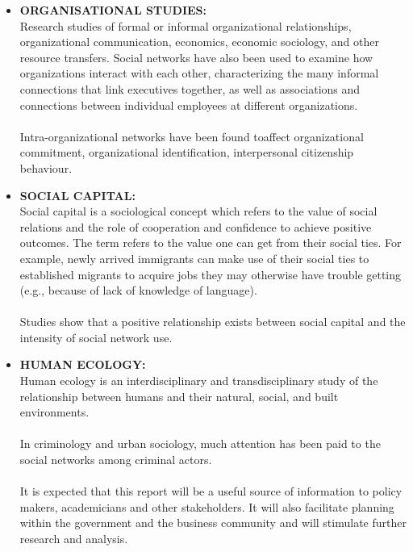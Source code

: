 \documentclass[11pt]{book}
\begin{document}
\begin{itemize}
	\item \textbf{ORGANISATIONAL STUDIES:}\\
		Research studies of  formal or informal organizational relationships, organizational communication, economics, economic sociology, and other resource transfers. Social networks have also been used to examine how organizations interact with each other, characterizing the many informal connections that link executives together, as well as associations and connections between individual employees at different organizations. \\\\Intra-organizational networks have been found toaffect organizational commitment, organizational identification, interpersonal citizenship behaviour.
	\item \textbf{SOCIAL CAPITAL: }\\
		Social capital is a sociological concept which refers to the value of social relations and the role of cooperation and confidence to achieve positive outcomes. The term refers to the value one can get from their social ties. For example, newly arrived immigrants can make use of their social ties to established migrants to acquire jobs they may otherwise have trouble getting (e.g., because of lack of knowledge of language). \\\\Studies show that a positive relationship exists between social capital and the intensity of social network use.

	\item \textbf{HUMAN ECOLOGY: }\\
		Human ecology is an interdisciplinary and transdisciplinary study of the relationship between humans and their natural, social, and built environments. 
		\\\\In criminology and urban sociology, much attention has been paid to the social networks among criminal actors.
		\\\\It is expected that this report will be a useful source of information to policy makers, academicians and other stakeholders. It will also facilitate planning within the government and the business community and will stimulate further research and analysis.
\end{itemize}

\newpage
\thispagestyle{empty}
\end{document}
